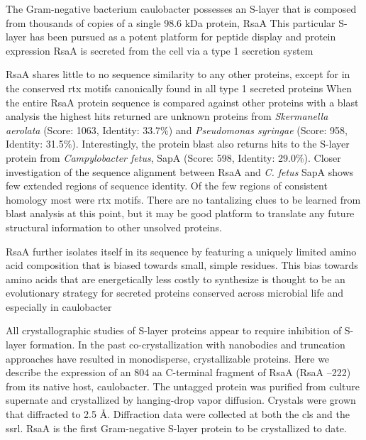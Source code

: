 The Gram-negative bacterium \ac{caulobacter} possesses an
\ac{S-layer} that is composed from thousands of copies of a single 98.6 kDa protein, RsaA
 This particular \ac{S-layer} has been pursued as a potent platform for peptide display and
protein expression
RsaA is secreted from the cell via a type 1
secretion system

 RsaA shares little to no sequence similarity to any
other proteins, except for in the conserved \ac{rtx}
motifs canonically found in all type 1 secreted
proteins When the entire RsaA protein
sequence is compared against other proteins with a \ac{blast} analysis the
highest hits returned are unknown proteins from \textit{Skermanella aerolata}
(Score: 1063, Identity: 33.7\%) and \textit{Pseudomonas syringae} (Score: 958,
Identity: 31.5\%). Interestingly, the protein \ac{blast} also returns hits to
the \ac{S-layer} protein from \textit{Campylobacter fetus}, SapA (Score: 598,
Identity: 29.0\%). Closer investigation of the sequence alignment between RsaA
and \textit{C. fetus} SapA shows few extended regions of sequence identity. 
Of the few regions of consistent homology most were \ac{rtx} motifs. There are
no tantalizing clues to be learned from \ac{blast} analysis at this point, but it
may be good platform to translate any future structural information to other
unsolved proteins.

 RsaA further isolates itself in its sequence by featuring a uniquely limited amino
acid composition that is biased towards small, simple residues. This bias
towards  amino acids that are energetically less costly to synthesize is thought to be an evolutionary strategy
for secreted proteins conserved across microbial life and especially in
\ac{caulobacter}

All crystallographic studies of \ac{S-layer} proteins appear to require inhibition of \ac{S-layer} formation. In the
past co-crystallization with nanobodies
 and truncation
 approaches have resulted in monodisperse, crystallizable proteins. Here we describe the
expression of an 804 \ac{aa} C-terminal fragment of RsaA (RsaA --222) from
its native host, \ac{caulobacter}. The untagged protein was purified
from culture supernate and crystallized by hanging-drop vapor
diffusion. Crystals were grown that diffracted to 2.5 \AA.
Diffraction data were collected at both the \ac{cls} 
and the \ac{ssrl}. RsaA is the first Gram-negative \ac{S-layer} protein to be
crystallized to date.

